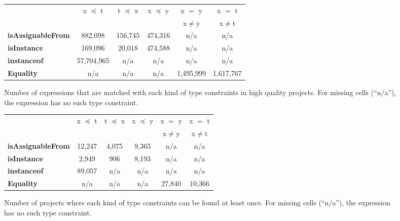 \begin{figure*}[tb]
\begin{center}
\begin{small}
\begin{tabular}{|l|c|c|c|c|c|}
\hline
& \multirow{2}{*}{x $\preceq$ t} &\multirow{2}{*}{t $\preceq$ x}& \multirow{2}{*}{x $\preceq$  y }& x $=$ y & x $=$ t
\\&&&&x$\neq$y&x$\neq$t\\
\hline
\hline
\textbf{isAssignableFrom} & 882,098& 156,745 & 474,316 & n/a &n/a\\
\textbf{isInstance}& 169,096 & 20,018 & 474,588 &n/a&n/a\\
\textbf{instanceof} &57,704,965&n/a&n/a&n/a&n/a\\
\textbf{Equality}&n/a&n/a&n/a &1,495,999&1,617,767 \\
\hline
\end{tabular}
\end{small}
\end{center}
\caption{Number of expressions that are matched with each kind of type constraints in high quality projects. For missing cells (``n/a''), the expression has no such type constraint. }
\label{fig:exprnumber_quality}
\end{figure*}

\begin{figure*}[tb]
\begin{center}
\begin{small}
\begin{tabular}{|l|c|c|c|c|c|}
\hline
& \multirow{2}{*}{x $\preceq$ t} &\multirow{2}{*}{t $\preceq$ x}& \multirow{2}{*}{x $\preceq$  y }& x $=$ y & x $=$ t
\\&&&&x$\neq$y&x$\neq$t\\
\hline
\hline
\textbf{isAssignableFrom} & 12,247 & 4,075 & 9,365 & n/a &n/a\\
\textbf{isInstance}&2,949 &906 &8,193&n/a&n/a\\
\textbf{instanceof} &89,057&n/a&n/a&n/a&n/a\\
\textbf{Equality}&n/a&n/a&n/a&27,840&10,366 \\
\hline
\end{tabular}
\end{small}
\end{center}
\caption{Number of projects where each kind of type constraints can be found at least once.  For missing cells (``n/a''), the expression has no such type constraint. }
\label{fig:projectnumber}
\end{figure*}


